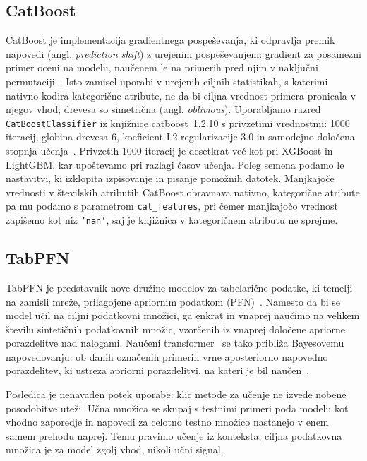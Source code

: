 \documentclass[a4paper,12pt,openright]{book}
\begin{document}
\subsection{CatBoost}
\label{sec:catboost}

CatBoost je implementacija gradientnega pospeševanja, ki odpravlja premik
napovedi (angl. \emph{prediction shift}) z urejenim pospeševanjem: gradient za
posamezni primer oceni na modelu, naučenem le na primerih pred njim v naključni
permutaciji~\cite{prokhorenkova2018catboost}. Isto zamisel uporabi v urejenih
ciljnih statistikah, s katerimi nativno kodira kategorične atribute, ne da bi
ciljna vrednost primera pronicala v njegov vhod; drevesa so simetrična
(angl. \emph{oblivious}). Uporabljamo razred \texttt{CatBoostClassifier} iz
knjižnice catboost~1.2.10 s privzetimi vrednostmi: 1000 iteracij, globina
drevesa 6, koeficient L2 regularizacije \num{3.0} in samodejno določena stopnja
učenja~\cite{catboostdocs}. Privzetih 1000 iteracij je desetkrat več kot pri
XGBoost in LightGBM, kar upoštevamo pri razlagi časov učenja. Poleg semena
podamo le nastavitvi, ki izklopita izpisovanje in pisanje pomožnih datotek.
Manjkajoče vrednosti v številskih atributih CatBoost obravnava nativno,
kategorične atribute pa mu podamo s parametrom \texttt{cat\_features}, pri čemer
manjkajočo vrednost zapišemo kot niz \texttt{'nan'}, saj je knjižnica v
kategoričnem atributu ne sprejme.

\subsection{TabPFN}
\label{sec:tabpfn}

TabPFN je predstavnik nove družine modelov za tabelarične podatke, ki temelji na
zamisli mreže, prilagojene apriornim podatkom
(PFN)~\cite{muller2022transformers}. Namesto da bi se model učil na
ciljni podatkovni množici, ga enkrat in vnaprej naučimo na velikem številu
sintetičnih podatkovnih množic, vzorčenih iz vnaprej določene apriorne
porazdelitve nad nalogami. Naučeni transformer~\cite{vaswani2017attention} se
tako približa Bayesovemu napovedovanju: ob danih označenih primerih vrne
aposteriorno napovedno porazdelitev, ki ustreza apriorni porazdelitvi, na kateri
je bil naučen~\cite{muller2022transformers}.

Posledica je nenavaden potek uporabe: klic metode za učenje ne izvede nobene
posodobitve uteži. Učna množica se skupaj s testnimi primeri poda modelu kot
vhodno zaporedje in napovedi za celotno testno množico nastanejo v enem samem
prehodu naprej. Temu pravimo učenje iz konteksta; ciljna podatkovna množica je za model zgolj vhod, nikoli učni signal.
\end{document}
